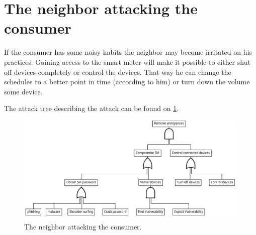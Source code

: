 \section{The neighbor attacking the consumer}

If the consumer has some noisy habits the neighbor may become irritated on his practices.
Gaining access to the smart meter will make it possible to either shut off devices completely or control the devices.
That way he can change the schedules to a better point in time (according to him) or turn down the volume some device.

The attack tree describing the attack can be found on \cref{fig:attack_trees:neighbor}.

\begin{figure}[h]
  \centering
	\includegraphics[width=.75\textwidth]{figures/graphviz/neighbor_vs_consumer.pdf}
	\caption{The neighbor attacking the consumer.}
	\label{fig:attack_trees:neighbor}
\end{figure}